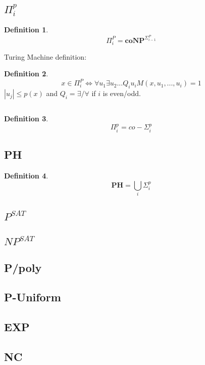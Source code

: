 \documentclass[]{article}
\theoremstyle{definition}
\newtheorem{definition}{Definition}[section]
\begin{document}
\subsection{$\Pi^p_i$}
\label{sec:pipi}
\begin{definition}
	$$\Pi_i^P = \hyperref[sec:coNP]{\textbf{coNP}}^{\hyperref[sec:sigmapi]{\Sigma_{i-1}^P}}$$
\end{definition}
$ $
\\
Turing Machine definition:
\begin{definition}
	$$x \in \Pi_i^P\iff \forall u_1\exists u_2 ... Q_i u_i M(x,u_1,...,u_i) = 1$$
	$|u_j| \leq p(x)$ and $Q_i=\exists/\forall$ if $i$ is even/odd.
\end{definition}
$ $
\\
\begin{definition}
	$$\Pi_i^p ={\hyperref[sec:sigmapi]{co-\Sigma_{i}^p}}$$
\end{definition}
\subsection{PH}
\label{sec:PH}
\begin{definition}
	$$\textbf{PH} =\bigcup_i\hyperref[sec:sigmapi]{\Sigma_{i}^p}$$
\end{definition}
\iffalse
\subsection{$P^{SAT}$}

\subsection{$NP^{SAT}$}

\subsection{P/poly}

\subsection{P-Uniform}

\subsection{EXP}

\subsection{NC}
\end{document}
